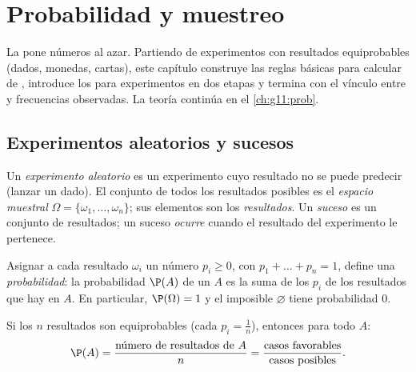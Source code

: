 \chapter{Probabilidad y muestreo}\label{ch:g10:proba}

La  pone números al azar. Partiendo de experimentos con
resultados equiprobables (dados, monedas, cartas), este capítulo construye
las reglas básicas para calcular  de , introduce los
 para experimentos en dos etapas y termina con el
vínculo entre  y frecuencias observadas. La teoría continúa
en el \cref{ch:g11:prob}.

\section{Experimentos aleatorios y sucesos}

\begin{definition}\label{def:g10:proba:events}
Un \emph{experimento aleatorio} es un
experimento cuyo resultado no se puede predecir (lanzar un dado). El
conjunto de todos los resultados posibles es el \emph{espacio
muestral} $\Omega = \{\omega_1, \dots, \omega_n\}$;
sus elementos son los \emph{resultados}. Un \emph{suceso} es
un conjunto de resultados; un suceso \emph{ocurre} cuando el resultado del
experimento le pertenece.
\end{definition}

\begin{definition}\label{def:g10:proba:distribution}
Asignar a cada resultado $\omega_i$ un número $p_i \geq 0$, con
$p_1 + \dots + p_n = 1$, define una
\emph{probabilidad}: la probabilidad $\P(A)$ de un
 $A$ es la suma de los $p_i$ de los resultados que hay en $A$. En
particular, $\P(\Omega) = 1$ y el  imposible $\varnothing$ tiene
probabilidad $0$.
\end{definition}

\begin{proposition}\label{prop:g10:proba:uniform}
Si los $n$ resultados son equiprobables (cada $p_i = \frac1n$), entonces
para todo  $A$:
\[
\P(A) = \frac{\text{número de resultados de } A}{n}
= \frac{\text{casos favorables}}{\text{casos posibles}} .
\]
\end{proposition}


